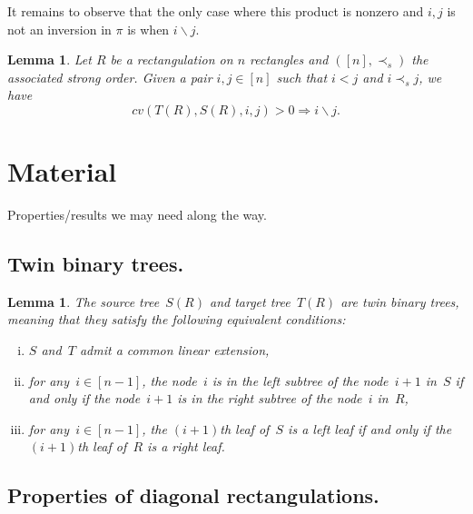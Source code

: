 \documentclass{amsart}
\newtheorem{lemma}[theorem]{Lemma}
\theoremstyle{definition}
\renewcommand{\implies}{\Rightarrow} %
\newcommand{\darkblue}{\color{darkblue}} %
\newcommand{\defn}[1]{\textsl{\darkblue #1}} %
\begin{document}
It remains to observe that the only case where this product is nonzero and $i,j$ is not an inversion in $\pi$ is when $i\backslash j$.

\begin{lemma}
  Let $R$ be a rectangulation on $n$ rectangles and $([n],\prec_s)$ the associated strong order.
  Given a pair $i,j\in [n]$ such that $i<j$ and $i\prec_s j$, we have
  \[
    cv (T(R), S(R), i, j) > 0 \implies i\backslash j.
  \]
\end{lemma}



{}


\label{sec:biblio}


\newpage
\appendix
\section{Material}

Properties/results we may need along the way.

\subsection{Twin binary trees.}

\begin{lemma}
The source tree~$S(R)$ and target tree~$T(R)$ are \defn{twin binary trees}, meaning that they satisfy the following equivalent conditions:
\begin{enumerate}[(i)]
\item $S$ and~$T$ admit a common linear extension,
\item for any~$i \in [n-1]$, the node~$i$ is in the left subtree of the node~$i+1$ in~$S$ if and only if the node~$i+1$ is in the right subtree of the node~$i$ in~$R$,
\item for any~$i \in [n-1]$, the $(i+1)$th leaf of~$S$ is a left leaf if and only if the $(i+1)$th leaf of~$R$ is a right leaf.
\end{enumerate}
\end{lemma}

\subsection{Properties of diagonal rectangulations.}
\end{document}

